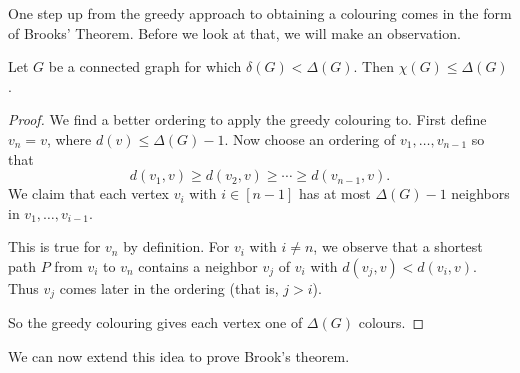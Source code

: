 \documentclass[a4paper]{scrreprt}
\begin{document}
One step up from the greedy approach to obtaining a colouring comes in the form of Brooks' Theorem. Before we look at that, we will make an observation.

\begin{proposition}
	Let $G$ be a connected graph for which $\delta(G) < \Delta(G)$. Then $\chi(G) \leq \Delta(G)$.
\end{proposition}
\begin{proof}
	We find a better ordering to apply the greedy colouring to. First define $v_n = v$, where $d(v) \leq \Delta(G) - 1$. Now choose an ordering of $v_1, \dots, v_{n - 1}$ so that
	$$
	d(v_1, v) \geq d(v_2, v) \geq \cdots \geq d(v_{n - 1}, v).
	$$
	We claim that each vertex $v_i$ with $i \in [n - 1]$ has at most $\Delta(G) - 1$ neighbors in $v_1, \dots, v_{i - 1}$.

	This is true for $v_n$ by definition. For $v_i$ with $i \neq n$, we observe that a shortest path $P$ from $v_i$ to $v_n$ contains a neighbor $v_j$ of $v_i$ with $d(v_j, v) < d(v_i, v)$. Thus $v_j$ comes later in the ordering (that is, $j > i$).

	So the greedy colouring gives each vertex one of $\Delta(G)$ colours.
\end{proof}

We can now extend this idea to prove Brook's theorem.
\end{document}
